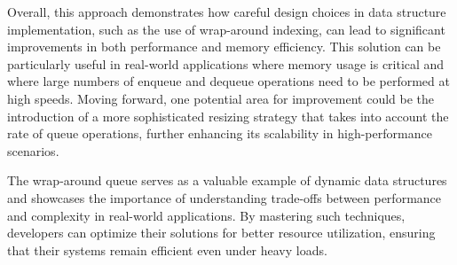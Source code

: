 Overall, this approach demonstrates how careful design choices in data structure implementation, such as the use of wrap-around indexing, can lead to significant improvements in both performance and memory efficiency. This solution can be particularly useful in real-world applications where memory usage is critical and where large numbers of enqueue and dequeue operations need to be performed at high speeds. Moving forward, one potential area for improvement could be the introduction of a more sophisticated resizing strategy that takes into account the rate of queue operations, further enhancing its scalability in high-performance scenarios.

The wrap-around queue serves as a valuable example of dynamic data structures and showcases the importance of understanding trade-offs between performance and complexity in real-world applications. By mastering such techniques, developers can optimize their solutions for better resource utilization, ensuring that their systems remain efficient even under heavy loads.